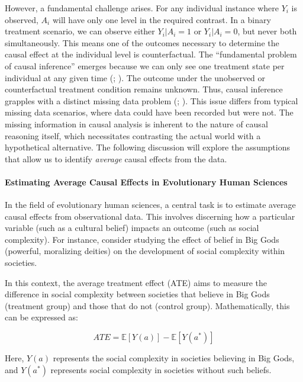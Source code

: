 \documentclass[
  singlecolumn,
  9pt]{article}
\let\oldparagraph\paragraph
\renewcommand{\paragraph}[1]{\oldparagraph{#1}\mbox{}}
\begin{document}
However, a fundamental challenge arises. For any individual instance
where \(Y_i\) is observed, \(A_i\) will have only one level in the
required contrast. In a binary treatment scenario, we can observe either
\(Y_i|A_i = 1\) or \(Y_i|A_i = 0\), but never both simultaneously. This
means one of the outcomes necessary to determine the causal effect at
the individual level is counterfactual. The ``fundamental problem of
causal inference'' emerges because we can only see one treatment state
per individual at any given time (; ). The outcome under the
unobserved or counterfactual treatment condition remains unknown. Thus,
causal inference grapples with a distinct missing data problem
(;
). This issue
differs from typical missing data scenarios, where data could have been
recorded but were not. The missing information in causal analysis is
inherent to the nature of causal reasoning itself, which necessitates
contrasting the actual world with a hypothetical alternative. The
following discussion will explore the assumptions that allow us to
identify \emph{average} causal effects from the data.

\paragraph{Estimating Average Causal Effects in Evolutionary Human
Sciences}\label{estimating-average-causal-effects-in-evolutionary-human-sciences}

In the field of evolutionary human sciences, a central task is to
estimate average causal effects from observational data. This involves
discerning how a particular variable (such as a cultural belief) impacts
an outcome (such as social complexity). For instance, consider studying
the effect of belief in Big Gods (powerful, moralizing deities) on the
development of social complexity within societies.

In this context, the average treatment effect (ATE) aims to measure the
difference in social complexity between societies that believe in Big
Gods (treatment group) and those that do not (control group).
Mathematically, this can be expressed as:

\[
ATE = \mathbb{E}[Y(a)] - \mathbb{E}[Y(a^*)]
\]

Here, \(Y(a)\) represents the social complexity in societies believing
in Big Gods, and \(Y(a^*)\) represents social complexity in societies
without such beliefs.
\end{document}

